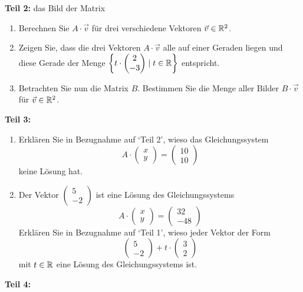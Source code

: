 \begin{LA}
\textbf{Teil 2:} das Bild der Matrix
\begin{enumerate}
    \item Berechnen Sie $A \cdot \vec{v}$ für drei verschiedene Vektoren $\vec{v} \in \mathbb{R}^2$.
    \item Zeigen Sie, dass die drei Vektoren $A \cdot \vec{v}$ alle auf einer Geraden liegen und diese Gerade der Menge $\left\{t\cdot \begin{pmatrix}
    2\\-3
\end{pmatrix} \mid t \in \mathbb{R}\right\}$ entspricht.
    \item Betrachten Sie nun die Matrix $B$. Bestimmen Sie die Menge aller Bilder $B \cdot \vec{v}$ für $\vec{v} \in \mathbb{R}^2$.

\end{enumerate}

\textbf{Teil 3:}
\begin{enumerate}
    \item Erklären Sie in Bezugnahme auf `Teil 2', wieso das Gleichungssystem 
    $$A\cdot \begin{pmatrix}
    x\\y
\end{pmatrix}= \begin{pmatrix}
    10\\10
\end{pmatrix}$$
keine Lösung hat.
\item Der Vektor $\begin{pmatrix}
    5\\-2
\end{pmatrix}$ ist eine Lösung des Gleichungssystems
$$A\cdot \begin{pmatrix}
    x\\y
\end{pmatrix}= \begin{pmatrix}
    32\\-48
\end{pmatrix}$$
Erklären Sie in Bezugnahme auf `Teil 1', wieso jeder Vektor der Form
$$\begin{pmatrix}
    5\\-2
\end{pmatrix} + t \cdot \begin{pmatrix}
    3\\2
\end{pmatrix}$$
mit $t \in \mathbb{R}$ eine Lösung des Gleichungssystems ist.
\end{enumerate}

\textbf{Teil 4:}


\end{LA}
